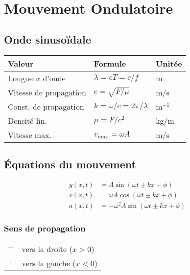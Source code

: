 \section{Mouvement Ondulatoire}
\vspace{-2\baselineskip}
\subsection{Onde sinusoïdale}

\begin{tabular}{lll}
Valeur & Formule & Unitée \\\hline
Longueur d'onde & \(\lambda = cT = c/f\) & m \\%
Vitesse de propagation & \(c=\sqrt{F/\mu} \) & m/s \\%
Const. de propagation & \(k = \omega/c = 2\pi/\lambda\)& m$^{-1}$\\
Densité lin. & \(\mu = F/c^2\) & kg/m\\
Vitesse max. & \( v_{\textit{max}}=\omega A\) & m/s\\%
\end{tabular}%


\subsection{Équations du mouvement}
\begin{align*}
    y(x,t) &= A\sin (\omega t \pm kx+\phi)\\
    v(x,t) &=\omega A\cos (\omega t \pm kx+\phi)\\
    a(x,t) &= -\omega^2 A\sin (\omega t \pm kx+\phi)
\end{align*}
\subsubsection{Sens de propagation}
\begin{center}
    \begin{tabular}{cl}
        $-$ & vers la droite ($x>0$)\\
        $+$ & vers la gauche ($x<0$)
    \end{tabular}
\end{center}


